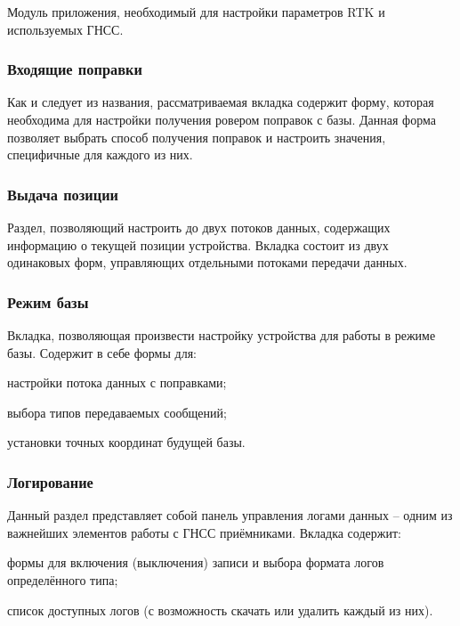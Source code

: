 Модуль приложения, необходимый для настройки параметров RTK и используемых ГНСС.

\subsubsection{Входящие поправки}

Как и следует из названия, рассматриваемая вкладка содержит форму, которая необходима для настройки получения ровером поправок с базы. Данная форма позволяет выбрать способ получения поправок и настроить значения, специфичные для каждого из них.

\subsubsection{Выдача позиции}

Раздел, позволяющий настроить до двух потоков данных, содержащих информацию о текущей позиции устройства. Вкладка состоит из двух одинаковых форм, управляющих отдельными потоками передачи данных.

\subsubsection{Режим базы}

Вкладка, позволяющая произвести настройку устройства для работы в режиме базы. Содержит в себе формы для:
\begin{dashitemize}
  \item настройки потока данных с поправками;
  \item выбора типов передаваемых сообщений;
  \item установки точных координат будущей базы.
\end{dashitemize}

\subsubsection{Логирование}

Данный раздел представляет собой панель управления логами данных -- одним из важнейших элементов работы с ГНСС приёмниками. Вкладка содержит:
\begin{dashitemize}
  \item формы для включения (выключения) записи и выбора формата логов определённого типа;
  \item список доступных логов (с возможность скачать или удалить каждый из них).
\end{dashitemize}

